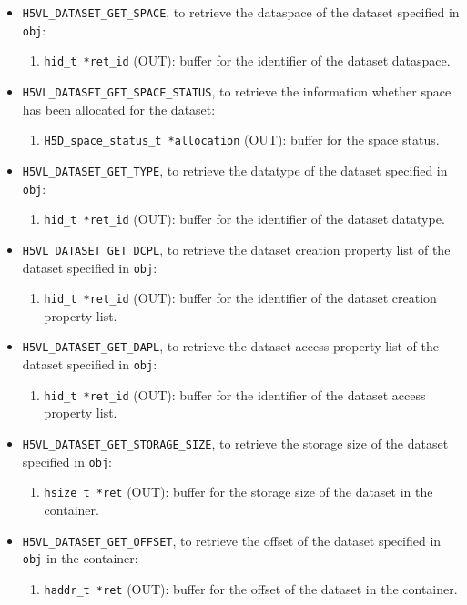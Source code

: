\begin{itemize}
\item {\tt H5VL\_DATASET\_GET\_SPACE}, to retrieve the dataspace of the
  dataset specified in {\tt obj}:
  \begin{enumerate}
  \item {\tt hid\_t *ret\_id} (OUT): buffer for the identifier of the
    dataset dataspace.
  \end{enumerate}

\item {\tt H5VL\_DATASET\_GET\_SPACE\_STATUS}, to retrieve the
  information whether space has been allocated for the dataset:
  \begin{enumerate}
  \item {\tt H5D\_space\_status\_t *allocation} (OUT): buffer for the
    space status.
  \end{enumerate}

\item {\tt H5VL\_DATASET\_GET\_TYPE}, to retrieve the datatype of the
  dataset specified in {\tt obj}:
  \begin{enumerate}
  \item {\tt hid\_t *ret\_id} (OUT): buffer for the identifier of the
    dataset datatype.
  \end{enumerate}

\item {\tt H5VL\_DATASET\_GET\_DCPL}, to retrieve the dataset creation
  property list of the dataset specified in {\tt obj}:
  \begin{enumerate}
  \item {\tt hid\_t *ret\_id} (OUT): buffer for the identifier of the
    dataset creation property list.
  \end{enumerate}

\item {\tt H5VL\_DATASET\_GET\_DAPL}, to retrieve the dataset access
  property list of the dataset specified in {\tt obj}:
  \begin{enumerate}
  \item {\tt hid\_t *ret\_id} (OUT): buffer for the identifier of the
    dataset access property list.
  \end{enumerate}

\item {\tt H5VL\_DATASET\_GET\_STORAGE\_SIZE}, to retrieve the storage
  size of the dataset specified in {\tt obj}:
  \begin{enumerate}
  \item {\tt hsize\_t *ret} (OUT): buffer for the storage size of
    the dataset in the container.
  \end{enumerate}

\item {\tt H5VL\_DATASET\_GET\_OFFSET}, to retrieve the offset of the
  dataset specified in {\tt obj} in the container:
  \begin{enumerate}
  \item {\tt haddr\_t *ret} (OUT): buffer for the offset of the
    dataset in the container.
  \end{enumerate}
\end{itemize}

